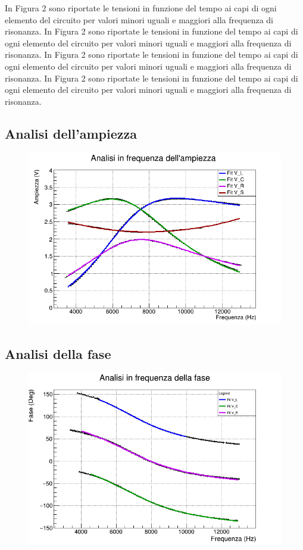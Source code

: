 \documentclass{article}
\begin{document}
In Figura 2 sono riportate le tensioni in funzione del tempo ai capi di ogni elemento del circuito per valori minori uguali e maggiori alla frequenza di risonanza. 
In Figura 2 sono riportate le tensioni in funzione del tempo ai capi di ogni elemento del circuito per valori minori uguali e maggiori alla frequenza di risonanza. 
In Figura 2 sono riportate le tensioni in funzione del tempo ai capi di ogni elemento del circuito per valori minori uguali e maggiori alla frequenza di risonanza. 
In Figura 2 sono riportate le tensioni in funzione del tempo ai capi di ogni elemento del circuito per valori minori uguali e maggiori alla frequenza di risonanza. 

\subsection{Analisi dell'ampiezza}
\begin{figure}[h]
  \centering
  \includegraphics[scale=0.45]{AmpFreq.png}
\end{figure}
\subsection{Analisi della fase}
\begin{figure}[h]
  \centering
  \includegraphics[scale=0.45]{FaseFreq.png}
\end{figure}
\end{document}
